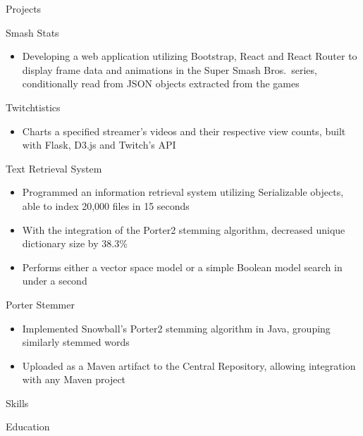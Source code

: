 \documentclass[]{xjavathehutt}
\begin{document}
\begin{cvsection}{Projects}
  \begin{cvproject}{Smash Stats}
    \begin{itemize}
      \item{Developing a web application utilizing Bootstrap, React and React Router to display
          frame data and animations in the Super Smash Bros.\ series, conditionally read from
          JSON objects extracted from the games}
    \end{itemize}
  \end{cvproject}

  \begin{cvproject}{Twitchtistics}
    \begin{itemize}
      \item{Charts a specified streamer's videos and their respective view counts, built with Flask,
        D3.js and Twitch's API}
    \end{itemize}
  \end{cvproject}

  \begin{cvproject}{Text Retrieval System}
    \begin{itemize}
      \item{Programmed an information retrieval system utilizing Serializable objects, able to index 20,000 files in 15 seconds}
      \item{With the integration of the Porter2 stemming algorithm, decreased unique dictionary size by 38.3\%}
      \item{Performs either a vector space model or a simple Boolean model search in under a second}
    \end{itemize}
  \end{cvproject}

  \begin{cvproject}{Porter Stemmer}
    \begin{itemize}
      \item{Implemented Snowball's Porter2 stemming algorithm in Java, grouping similarly stemmed words}
      \item{Uploaded as a Maven artifact to the Central Repository, allowing integration with any Maven project}
    \end{itemize}
  \end{cvproject}
\end{cvsection}


\begin{cvsection}{Skills}
  \printskills
\end{cvsection}


\begin{cvsection}{Education}
\end{cvsection}


\end{document}
